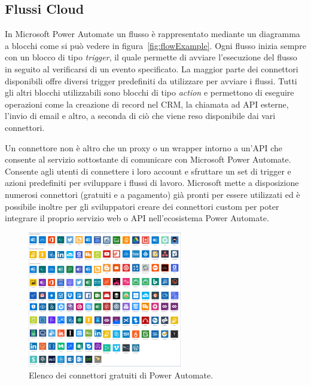 \subsection{Flussi Cloud}
In Microsoft Power Automate un flusso è rappresentato mediante un diagramma a blocchi come si può vedere in figura~\ref{fig:flowExample}. Ogni flusso inizia sempre con un blocco di tipo \textit{trigger}, il quale permette di avviare l'esecuzione del flusso in seguito al verificarsi di un evento specificato. La maggior parte dei connettori disponibili offre diversi trigger predefiniti da utilizzare per avviare i flussi. Tutti gli altri blocchi utilizzabili sono blocchi di tipo \textit{action} e permettono di eseguire operazioni come la creazione di record nel CRM, la chiamata ad API esterne, l'invio di email e altro, a seconda di ciò che viene reso disponibile dai vari connettori.

Un connettore non è altro che un proxy o un wrapper intorno a un'API che consente al servizio sottostante di comunicare con Microsoft Power Automate. Consente agli utenti di connettere i loro account e sfruttare un set di trigger e azioni predefiniti per sviluppare i flussi di lavoro. Microsoft mette a disposizione numerosi connettori (gratuiti e a pagamento) già pronti per essere utilizzati ed è possibile inoltre per gli sviluppatori creare dei connettori custom per poter integrare il proprio servizio web o API nell'ecosistema Power Automate.

\begin{figure}[ht!]
  \centering
  \includegraphics[width=0.6\textwidth]{connectors.png}
  \caption{Elenco dei connettori gratuiti di Power Automate.}
  \label{fig:connectors}
\end{figure}

